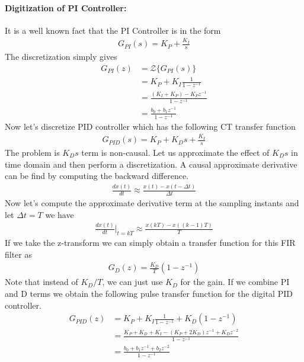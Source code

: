 \documentclass[twoside]{article}
\begin{document}
\paragraph{Digitization of PI Controller:} It is a well known fact
that the PI Controller is in the form
%
\begin{align*}
   G_{PI}(s) = K_P + \frac{K_I}{s}
\end{align*}
%
The discretization simply gives
%
\begin{align*}
   G_{PI}(z) &= \mathcal{Z} \lbrace G_{PI}(s) \rbrace \\
&= K_P + K_I
  \frac{1}{1 - z^{-1}} \\
&= \frac{(K_I + K_P) - K_P z^{-1}}{1 - z^{-1}}
\\
&= \frac{b_0 + b_1 z^{-1}}{1 - z^{-1}}
\end{align*}
%
Now let's discretize PID controller which has the following CT
transfer function 
%
\begin{align*}
   G_{PID}(s) = K_P + K_D s + \frac{K_I}{s}
\end{align*}
%
The problem is $K_D  s$ term is non-causal. Let us approximate 
the effect of $K_D s$ in time domain and then perform a
discretization. A causal approximate derivative can be find 
by computing the backward difference.
%
\begin{align*}
 \frac{d x(t)}{dt} \approx \frac{x(t) - x(t-\Delta t)}{\Delta t}
\end{align*}
% 
Now let's compute the approximate derivative term at the sampling
instants and let $\Delta t = T$ we have 
%
\begin{align*}
 \frac{d x(t)}{dt}|_{t = kT} \approx \frac{x(k T) - x( (k-1) T)}{T}
\end{align*}
%
If we take the z-transform we can simply obtain a transfer function
for this FIR filter as
%
\begin{align*}
 G_{D}(z) = \frac{K_D}{T} (1 - z^{-1})
\end{align*}
%
Note that instead of $K_D / T$, we can just use $K_D$ for the gain. 
If we combine PI and D terms we obtain the following pulse transfer
function for the digital PID controller.
%
\begin{align*}
   G_{PID}(z) &= K_P + K_I
  \frac{1}{1 - z^{-1}}  + K_D \left(1 - z^{-1} \right)
\\
&= \frac{ K_P + K_D + K_I - (K_P + 2 K_D) z^{-1} + K_D z^{-2} }{ 1 -
  z^{-1} }
\\
&= \frac{b_0 + b_1 z^{-1} + b_2 z^{-2} }{ 1 -
  z^{-1} }
\end{align*}
\end{document}
